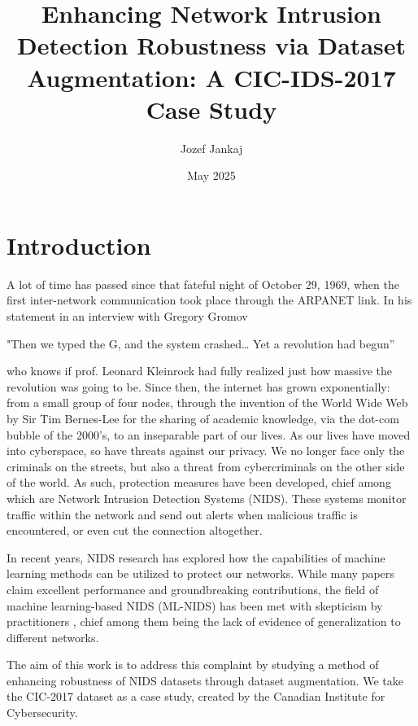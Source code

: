 \documentclass[english]{article}
\title{Enhancing Network Intrusion Detection Robustness via Dataset Augmentation: A CIC-IDS-2017 Case Study}
\author{Jozef Jankaj}
\date{May 2025}
\begin{document}
	
	
	
	
	
	
	\tableofcontents
	
	\newpage
	\setcounter{page}{1}
	\section{Introduction}
	A lot of time has passed since that fateful night of October 29, 1969, when the first inter-network communication took place through the ARPANET link. In his statement in an interview with Gregory Gromov
	
	\begin{center} 
		"Then we typed the G, and the system crashed… Yet a revolution had begun” \cite{kleinrock}
	\end{center}
	
	who knows if prof. Leonard Kleinrock had fully realized just how massive the revolution was going to be. 
	Since then, the internet has grown exponentially: from a small group of four nodes, through the invention of the World Wide Web by Sir Tim Bernes-Lee for the sharing of academic knowledge, via the dot-com bubble of the 2000's, to an inseparable part of our lives. As our lives have moved into cyberspace, so have threats against our privacy. We no longer face only the criminals on the streets, but also a threat from cybercriminals on the other side of the world. As such, protection measures have been developed, chief among which are Network Intrusion Detection Systems (NIDS). These systems monitor traffic within the network and send out alerts when malicious traffic is encountered, or even cut the connection altogether. 
	
	In recent years, NIDS research has explored how the capabilities of machine learning methods can be utilized to protect our networks. While many papers claim excellent performance and groundbreaking contributions, the field of machine learning-based NIDS (ML-NIDS) has been met with skepticism by practitioners \cite{sok_nids_assessment}, chief among them being the lack of evidence of generalization to different networks.
	
	The aim of this work is to address this complaint by studying a method of enhancing robustness of NIDS datasets through dataset augmentation. We take the CIC-2017 dataset \cite{cic_2017} as a case study, created by the Canadian Institute for Cybersecurity. 
	
\end{document}
